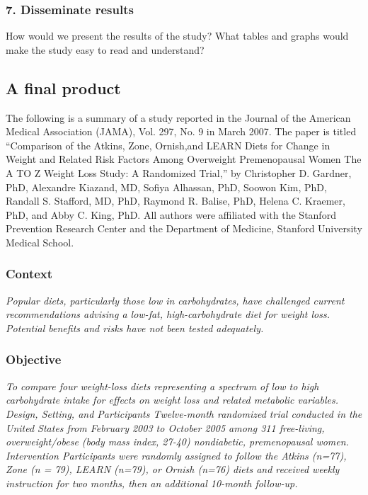 \documentclass[11pt]{book}\usepackage[]{graphicx}\usepackage[]{color}
\begin{document}
\subsubsection{7.	Disseminate results}

How would we present the results of the study?  What tables and graphs would make the study easy to read and understand?

\subsection{A final product}

The following is a summary of a study reported in the Journal of the American Medical Association (JAMA), Vol. 297, No. 9 in March 2007.  The paper is titled ``Comparison of the Atkins, Zone, Ornish,and LEARN Diets for Change in Weight and Related Risk Factors Among Overweight Premenopausal Women The A TO Z Weight Loss Study: A Randomized Trial,'' by Christopher D. Gardner, PhD, Alexandre Kiazand, MD, Sofiya Alhassan, PhD, Soowon Kim, PhD, Randall S. Stafford, MD, PhD, Raymond R. Balise, PhD, Helena C. Kraemer, PhD, and Abby C. King, PhD.  All authors were affiliated with the Stanford Prevention Research Center and the Department of Medicine, Stanford University Medical School.

\subsubsection{Context}

\textit{Popular diets, particularly those low in carbohydrates, have challenged current recommendations advising a low-fat, high-carbohydrate diet for weight loss. Potential benefits and risks have not been tested adequately.}

\subsubsection{Objective}

\textit{To compare four weight-loss diets representing a spectrum of low to high carbohydrate intake for effects on weight loss and related metabolic variables.  Design, Setting, and Participants Twelve-month randomized trial conducted in the United States from February 2003 to October 2005 among 311 free-living, overweight/obese (body mass index, 27-40) nondiabetic, premenopausal women.  Intervention Participants were randomly assigned to follow the Atkins (n=77), Zone (n = 79), LEARN (n=79), or Ornish (n=76) diets and received weekly instruction for two months, then an additional 10-month follow-up.}
\end{document}
